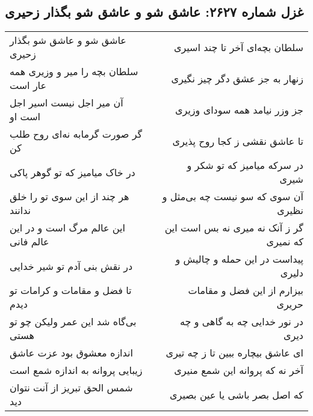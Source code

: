 \begin{center}
\section*{غزل شماره ۲۶۲۷: عاشق شو و عاشق شو بگذار زحیری}
\label{sec:2627}
\begin{longtable}{l p{0.5cm} r}
عاشق شو و عاشق شو بگذار زحیری
&&
سلطان بچه‌ای آخر تا چند اسیری
\\
سلطان بچه را میر و وزیری همه عار است
&&
زنهار به جز عشق دگر چیز نگیری
\\
آن میر اجل نیست اسیر اجل است او
&&
جز وزر نیامد همه سودای وزیری
\\
گر صورت گرمابه نه‌ای روح طلب کن
&&
تا عاشق نقشی ز کجا روح پذیری
\\
در خاک میامیز که تو گوهر پاکی
&&
در سرکه میامیز که تو شکر و شیری
\\
هر چند از این سوی تو را خلق ندانند
&&
آن سوی که سو نیست چه بی‌مثل و نظیری
\\
این عالم مرگ است و در این عالم فانی
&&
گر ز آنک نه میری نه بس است این که نمیری
\\
در نقش بنی آدم تو شیر خدایی
&&
پیداست در این حمله و چالیش و دلیری
\\
تا فضل و مقامات و کرامات تو دیدم
&&
بیزارم از این فضل و مقامات حریری
\\
بی‌گاه شد این عمر ولیکن چو تو هستی
&&
در نور خدایی چه به گاهی و چه دیری
\\
اندازه معشوق بود عزت عاشق
&&
ای عاشق بیچاره ببین تا ز چه تیری
\\
زیبایی پروانه به اندازه شمع است
&&
آخر نه که پروانه این شمع منیری
\\
شمس الحق تبریز از آنت نتوان دید
&&
که اصل بصر باشی یا عین بصیری
\\
\end{longtable}
\end{center}
